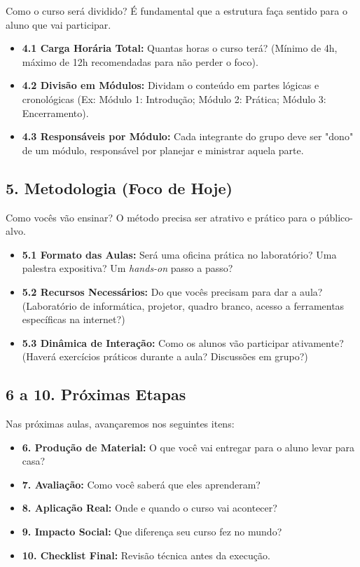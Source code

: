 \documentclass[12pt,a4paper]{article}
\begin{document}
\begin{boxAtividade}[Atividade 04]
Como o curso será dividido? É fundamental que a estrutura faça sentido para o aluno que vai participar.
\begin{itemize}
    \item \textbf{4.1 Carga Horária Total:} Quantas horas o curso terá? (Mínimo de 4h, máximo de 12h recomendadas para não perder o foco).
    \item \textbf{4.2 Divisão em Módulos:} Dividam o conteúdo em partes lógicas e cronológicas (Ex: Módulo 1: Introdução; Módulo 2: Prática; Módulo 3: Encerramento).
    \item \textbf{4.3 Responsáveis por Módulo:} Cada integrante do grupo deve ser "dono" de um módulo, responsável por planejar e ministrar aquela parte.
\end{itemize}
\end{boxAtividade}

\subsection{5. Metodologia (Foco de Hoje)}

\begin{boxAtividade}[Atividade 05]
Como vocês vão ensinar? O método precisa ser atrativo e prático para o público-alvo.
\begin{itemize}
    \item \textbf{5.1 Formato das Aulas:} Será uma oficina prática no laboratório? Uma palestra expositiva? Um \textit{hands-on} passo a passo?
    \item \textbf{5.2 Recursos Necessários:} Do que vocês precisam para dar a aula? (Laboratório de informática, projetor, quadro branco, acesso a ferramentas específicas na internet?)
    \item \textbf{5.3 Dinâmica de Interação:} Como os alunos vão participar ativamente? (Haverá exercícios práticos durante a aula? Discussões em grupo?)
\end{itemize}
\end{boxAtividade}

\subsection{6 a 10. Próximas Etapas}

Nas próximas aulas, avançaremos nos seguintes itens:
\begin{itemize}
    \item \textbf{6. Produção de Material:} O que você vai entregar para o aluno levar para casa?
    \item \textbf{7. Avaliação:} Como você saberá que eles aprenderam?
    \item \textbf{8. Aplicação Real:} Onde e quando o curso vai acontecer?
    \item \textbf{9. Impacto Social:} Que diferença seu curso fez no mundo?
    \item \textbf{10. Checklist Final:} Revisão técnica antes da execução.
\end{itemize}
\end{document}
